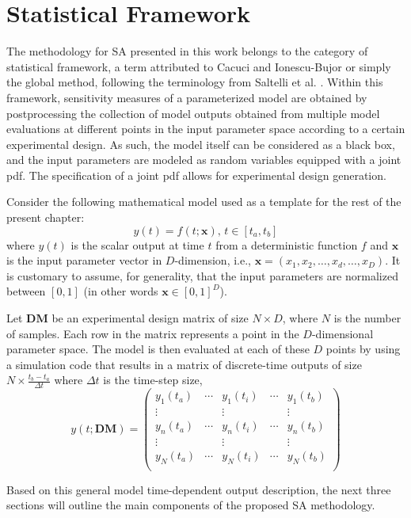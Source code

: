 \section{Statistical Framework}\label{sec:sa_statistical_framework}

The methodology for SA presented in this work belongs to
the category of statistical framework, a term attributed
to Cacuci and Ionescu-Bujor \cite{Ionescu-Bujor2004} or simply the global
method, following the terminology from Saltelli et al. \cite{Saltelli2004}.
Within this framework, sensitivity measures of a parameterized
model are obtained by postprocessing the collection
of model outputs obtained from multiple model
evaluations at different points in the input parameter space
according to a certain experimental design. 
As such, the model itself can be considered as a black box, 
and the input parameters are modeled as random variables
equipped with a joint \gls{pdf}. 
The specification of a joint \gls{pdf} allows for experimental design generation.

Consider the following mathematical model used as a template for the rest of the present chapter:
\begin{equation}
y(t) = f(t;\mathbf{x}), \, t \in [t_a,t_b]
\end{equation}
where $y(t)$ is the scalar output at time $t$ from a deterministic
function $f$ and $\mathbf{x}$ is the input parameter vector in
$D$-dimension, i.e., $\mathbf{x} = (x_1, x_2, \dots , x_d, \dots , x_D)$.
It is customary to assume, for generality, that the input parameters are normalized between $[0,1]$ (in other words $\mathbf{x} \in [0,1]^D$).

Let $\mathbf{DM}$ be an experimental design matrix of size
$N \times D$, where $N$ is the number of samples. 
Each row in the matrix represents a point in the $D$-dimensional parameter space. 
The model is then evaluated at each of these $D$ points by using a simulation code that results in a matrix of discrete-time outputs of size $N\times \frac{t_b-t_a}{\Delta t}$ where $\Delta t$ is the time-step size,
\begin{equation}
y(t; \mathbf{DM}) = 
\begin{pmatrix}
y_1(t_a)  & \cdots & y_1(t_i) & \cdots & y_1(t_b)\\
\vdots	  &        & \vdots   &        & \vdots\\
y_n(t_a)  & \cdots & y_n(t_i) & \cdots & y_n(t_b)\\
\vdots	  &        & \vdots   &        & \vdots\\
y_N(t_a)  & \cdots & y_N(t_i) & \cdots & y_N(t_b) \\
\end{pmatrix}
\label{eq:discrete_time}
\end{equation}

Based on this general model time-dependent output description, 
the next three sections will outline the main components of the proposed SA methodology.
